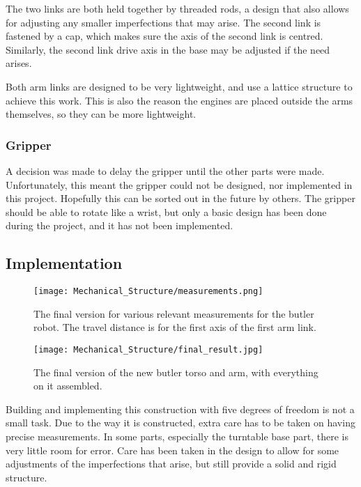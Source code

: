 The two links are both held together by threaded rods, a design that also allows for adjusting any smaller imperfections that may arise. The second link is fastened by a cap, which makes sure the axis of the second link is centred. Similarly, the second link drive axis in the base may be adjusted if the need arises.

Both arm links are designed to be very lightweight, and use a lattice structure to achieve this work. This is also the reason the engines are placed outside the arms themselves, so they can be more lightweight.


\subsubsection{Gripper}

A decision was made to delay the gripper until the other parts were made. Unfortunately, this meant the gripper could not be designed, nor implemented in this project. Hopefully this can be sorted out in the future by others. The gripper should be able to rotate like a wrist, but only a basic design has been done during the project, and it has not been implemented.

\subsection{Implementation}

\begin{figure}[!ht]
    \centering
    \texttt{[image: Mechanical\_Structure/measurements.png]}
    \caption{The final version for various relevant measurements for the butler robot. The travel distance is for the first axis of the first arm link.}
    \label{fig:final_version}
\end{figure}

\begin{figure}[!ht]
    \centering
    \texttt{[image: Mechanical\_Structure/final\_result.jpg]}
    \caption{The final version of the new butler torso and arm, with everything on it assembled.}
    \label{fig:mechanical_measurements}
\end{figure}

Building and implementing this construction with five degrees of freedom is not a small task. Due to the way it is constructed, extra care has to be taken on having precise measurements. In some parts, especially the turntable base part, there is very little room for error. Care has been taken in the design to allow for some adjustments of the imperfections that arise, but still provide a solid and rigid structure.

